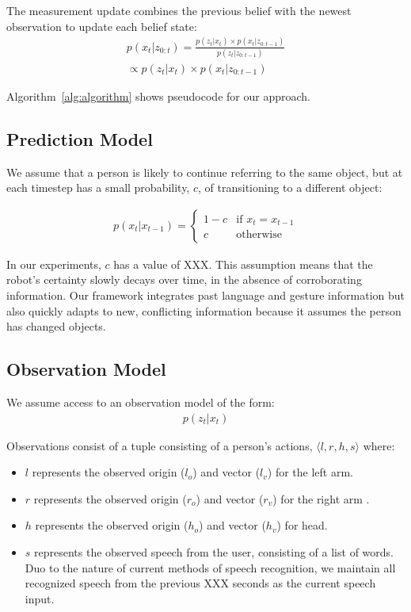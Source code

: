 \documentclass[letterpaper, 10 pt, conference]{ieeeconf}
\newcommand{\stnote}[1]{\textcolor{Blue}{\textbf{ST: #1}}}
\begin{document}
The measurement update combines the previous belief with the newest observation to update each belief state: 
\begin{align}
p(x_t |z_{0:t}) = \frac{p(z_t | x_t) \times p(x_t | z_{0:t-1})}{p(z_t | z_{0:t-1})} \\\propto p(z_t | x_t) \times p(x_t | z_{0:t-1})
\end{align}

Algorithm~\ref{alg:algorithm} shows pseudocode for our approach.


\subsection{Prediction Model}

We assume that a person is likely to continue referring to the same
object, but at each timestep has a small probability, $c$, of
transitioning to a different object: 

\begin{align}
p(x_t | x_{t-1}) = \left\{  \begin{array}{ll}
1-c &\mbox{if } x_t = x_{t-1}\\
c &\mbox{otherwise}
\end{array}\right.
\end{align}

In our experiments, $c$ has a value of XXX.  This assumption means
that the robot's certainty slowly decays over time, in the absence of
corroborating information.  Our framework integrates past language and
gesture information but also quickly adapts to new, conflicting
information because it assumes the person has changed objects.


\subsection{Observation Model}

We assume access to an observation model of the form:
\begin{align}
p(z_t | x_t)
\end{align}

Observations consist of a tuple consisting of a person's actions,
$\langle l, r, h, s\rangle $ where:
\begin{itemize}
	\item $l$ represents the observed origin ($l_o$) and vector ($l_v$) for the left arm.
	\item $r$ represents the observed origin  ($r_o$) and vector ($r_v$)  for the right arm .
	\item $h$ represents the observed origin  ($h_o$) and vector ($h_v$)  for head.
	\item $s$ represents the observed speech from the user,
          consisting of a list of words. Duo to the nature of current
          methods of speech recognition, we maintain all recognized
          speech from the previous XXX seconds as the current speech
          input.
	\end{itemize}
\end{document}
